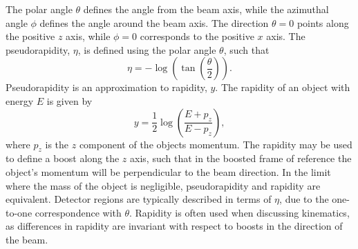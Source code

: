 The polar angle $\theta$ defines the angle from the beam axis, while the azimuthal angle $
\phi$ defines the angle around the beam axis. The direction $\theta = 0$ points along the positive $z$ axis, while $\phi = 0$ corresponds to the positive $x$ axis. The pseudorapidity, $\eta$, is defined using the polar angle $\theta$, such that 
\begin{equation}
\eta = - \log \left( \tan \left( \frac{\theta}{2} \right) \right).
\label{eqn_pseudorapidity}
\end{equation}
Pseudorapidity is an approximation to rapidity, $y$. The rapidity of an object with energy $E$ is given by
\begin{equation}
y = \frac{1}{2} \log \left(\frac{E+p_z}{E - p_z}\right),
\label{eqn_rapidity}
\end{equation}
where $p_z$ is the $z$ component of the objects momentum. The rapidity may be used to define a boost along the $z$ axis, such that in the boosted frame of reference the object's momentum will be perpendicular to the beam direction. In the limit where the mass of the object is negligible, pseudorapidity and rapidity are equivalent. Detector regions are typically described in terms of $\eta$, due to the one-to-one correspondence with $\theta$. Rapidity is often used when discussing kinematics, as differences in rapidity are invariant with respect to boosts in the direction of the beam.




 




%
%
%
%
%
%
%
%


